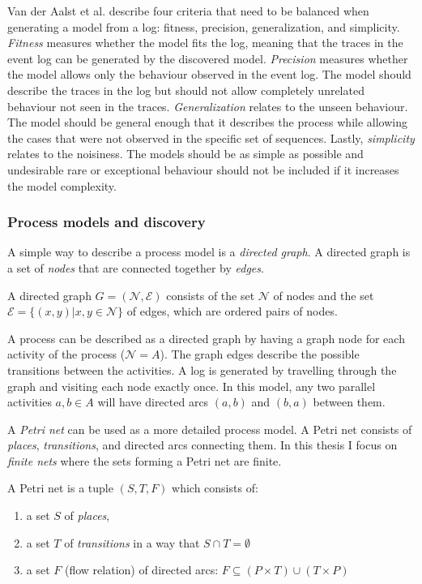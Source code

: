 Van der Aalst et al. \cite{van2013discovering} describe four criteria that need to be balanced when generating a model from a log: fitness, precision, generalization, and simplicity.
\emph{Fitness} measures whether the model fits the log, meaning that the traces in the event log can be generated by the discovered model.
\emph{Precision} measures whether the model allows only the behaviour observed in the event log. The model should describe the traces in the log but should not allow completely unrelated behaviour not seen in the traces.
\emph{Generalization} relates to the unseen behaviour. The model should be general enough that it describes the process while allowing the cases that were not observed in the specific set of sequences.
Lastly, \emph{simplicity} relates to the noisiness. The models should be as simple as possible and undesirable rare or exceptional behaviour should not be included if it increases the model complexity.


\subsubsection{Process models and discovery}

A simple way to describe a process model is a \emph{directed graph}. A directed graph is a set of \emph{nodes} that are connected together by \emph{edges}. 

\begin{definition}
A directed graph $G = (\mathcal{N}, \mathcal{E})$ consists of the set $\mathcal{N}$ of nodes and the set $\mathcal{E} = \{ (x,y) | x,y \in \mathcal{N} \} $ of edges, which are ordered pairs of nodes.
\end{definition}

A process can be described as a directed graph by having a graph node for each activity of the process ($\mathcal{N} = A$). The graph edges describe the possible transitions between the activities.
A log is generated by travelling through the graph and visiting each node exactly once. 
In this model, any two parallel activities $a, b \in A$ will have directed arcs $(a,b)$ and $(b,a)$ between them.

A \emph{Petri net} \cite{rozenberg1998lectures} can be used as a more detailed process model. A Petri net consists of \emph{places}, \emph{transitions}, and directed arcs connecting them. In this thesis I focus on \emph{finite nets} where the sets forming a Petri net are finite.

\begin{definition}
A Petri net is a tuple $(S, T, F)$ which consists of:
\begin{enumerate}
    \item a set $S$ of \emph{places},
    \item a set $T$ of \emph{transitions} in a way that $S \cap T = \emptyset$
    \item a set $F$ (flow relation) of directed arcs: $F \subseteq (P \times T) \cup (T \times P)$ 
\end{enumerate}
\end{definition}

